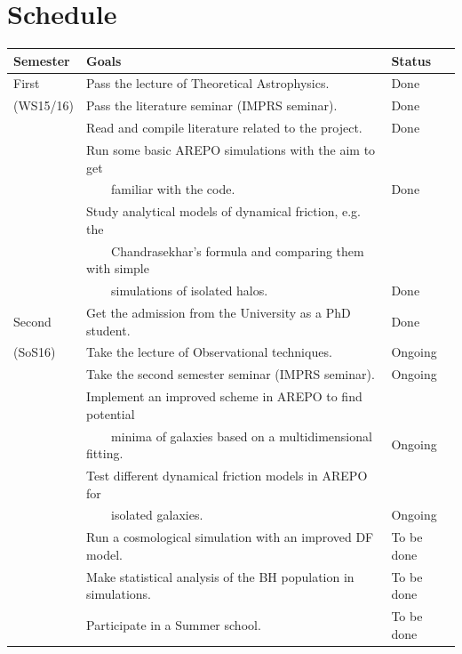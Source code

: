 \documentclass[a4,useAMS,usenatbib,usegraphicx,12pt]{article}
\begin{document}
\section*{Schedule}
\begin{table}[!htbp]
\begin{flushleft}
\begin{center}
\begin{footnotesize} 
  \begin{tabular}{l  l  l} \hline\hline
	\centering\textbf{Semester} & \textbf{Goals} & \textbf{Status} \\ \hline
	First  
	& \tabitem Pass the lecture of Theoretical Astrophysics.		& Done    \\
	(WS15/16)
	& \tabitem Pass the literature seminar (IMPRS seminar).			& Done    \\
	& \tabitem Read and compile literature related to the project.     	& Done    \\
	& \tabitem Run some basic AREPO simulations with the aim to get     	&         \\
	& \ \ \ \ familiar with the code. 					& Done    \\
	& \tabitem Study analytical models of dynamical friction, e.g. the   	&         \\
	& \ \ \ \ Chandrasekhar's formula and comparing them with simple        &         \\
	& \ \ \ \ simulations of isolated halos.  				& Done    \\
	
	\hline
	Second
	& \tabitem Get the admission from the University as a PhD student.  	& Done    \\
	(SoS16)
	& \tabitem Take the lecture of Observational techniques.  		& Ongoing \\
	& \tabitem Take the second semester seminar (IMPRS seminar).  		& Ongoing \\
	& \tabitem Implement an improved scheme in AREPO to find potential   	&	  \\
	& \ \ \ \ minima of galaxies based on a multidimensional fitting.  	& Ongoing \\
	& \tabitem Test different dynamical friction models in AREPO for   	&	  \\
	& \ \ \ \ isolated galaxies.						& Ongoing \\
	& \tabitem Run a cosmological simulation with an improved DF model.	& To be done \\
	& \tabitem Make statistical analysis of the BH population in simulations.& To be done \\
	& \tabitem Participate in a Summer school.  				& To be done \\
	

\end{tabular}
\end{footnotesize}
\end{center}
\end{flushleft}
\end{table}
\end{document}

